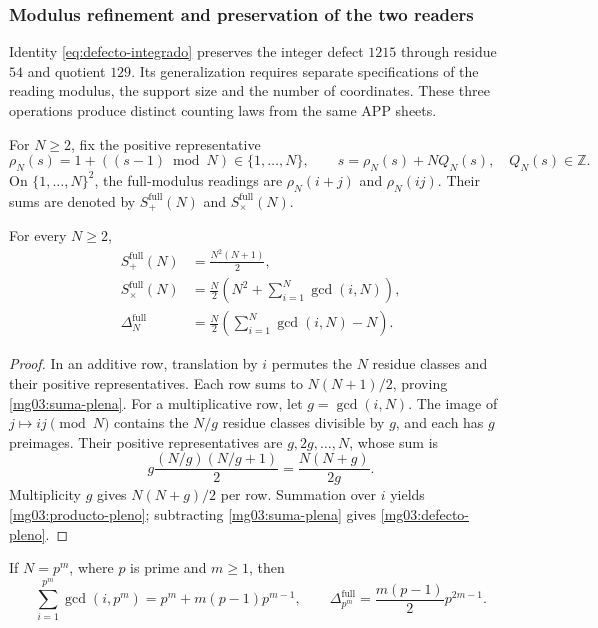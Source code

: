 \subsubsection{Modulus refinement and preservation of the two readers}
\label{mg03:refinamiento}

Identity \eqref{eq:defecto-integrado} preserves the integer defect
\(1215\) through residue \(54\) and quotient \(129\). Its
generalization requires separate specifications of the reading modulus,
the support size and the number of coordinates. These three operations
produce distinct counting laws from the same APP sheets.

For \(N\geq2\), fix the positive representative
\[
 \rho_N(s)=1+((s-1)\bmod N)\in\{1,\ldots,N\},
 \qquad s=\rho_N(s)+NQ_N(s),\quad Q_N(s)\in\mathbb Z.
\]
On \(\{1,\ldots,N\}^2\), the full-modulus readings are
\(\rho_N(i+j)\) and \(\rho_N(ij)\). Their sums are denoted by
\(S_+^{\mathrm{full}}(N)\) and \(S_\times^{\mathrm{full}}(N)\).

\begin{proposition}
For every \(N\geq2\),
\begin{align}
 S_+^{\mathrm{full}}(N)&=\frac{N^2(N+1)}2,
 \label{mg03:suma-plena}\\
 S_\times^{\mathrm{full}}(N)&=
 \frac N2\left(N^2+\sum_{i=1}^{N}\gcd(i,N)\right),
 \label{mg03:producto-pleno}\\
 \Delta_N^{\mathrm{full}}&=
 \frac N2\left(\sum_{i=1}^{N}\gcd(i,N)-N\right).
 \label{mg03:defecto-pleno}
\end{align}
\end{proposition}

\begin{proof}
In an additive row, translation by \(i\) permutes the \(N\) residue
classes and their positive representatives. Each row sums to
\(N(N+1)/2\), proving \eqref{mg03:suma-plena}. For a multiplicative
row, let \(g=\gcd(i,N)\). The image of \(j\mapsto ij\pmod N\)
contains the \(N/g\) residue classes divisible by \(g\), and each
has \(g\) preimages. Their positive representatives are
\(g,2g,\ldots,N\), whose sum is
\[
 g\frac{(N/g)(N/g+1)}2=\frac{N(N+g)}{2g}.
\]
Multiplicity \(g\) gives \(N(N+g)/2\) per row. Summation over
\(i\) yields \eqref{mg03:producto-pleno}; subtracting
\eqref{mg03:suma-plena} gives \eqref{mg03:defecto-pleno}.
\end{proof}

\begin{corollary}
If \(N=p^m\), where \(p\) is prime and \(m\geq1\), then
\begin{equation}
 \sum_{i=1}^{p^m}\gcd(i,p^m)
 =p^m+m(p-1)p^{m-1},\qquad
 \Delta_{p^m}^{\mathrm{full}}
 =\frac{m(p-1)}2p^{2m-1}.
 \label{mg03:primo-potencia}
\end{equation}
\end{corollary}

